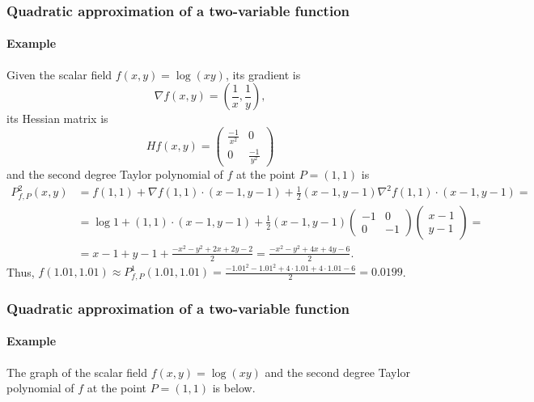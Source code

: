 \begin{frame}
\frametitle{Quadratic approximation of a two-variable function}
\framesubtitle{Example}
Given the scalar field $f(x,y)=\log(xy)$, its gradient is
\[
\nabla f(x,y) = \left(\frac{1}{x},\frac{1}{y}\right),
\]
its Hessian matrix is
\[
Hf(x,y) = \left(
\begin{array}{cc}
\frac{-1}{x^2} & 0\\
0 & \frac{-1}{y^2}
\end{array}
\right)
\]
and the second degree Taylor polynomial of $f$ at the point $P=(1,1)$ is 
\begin{align*}
P^2_{f,P}(x,y) &= f(1,1) +\nabla f(1,1)\cdot (x-1,y-1) + \frac{1}{2}(x-1,y-1)\nabla^2f(1,1)\cdot(x-1,y-1)=\\
&= \log 1+(1,1)\cdot(x-1,y-1) + \frac{1}{2}(x-1,y-1)
\left(
\begin{array}{cc}
-1 & 0\\
0 & -1
\end{array}
\right)
\left(
\begin{array}{c}
x-1\\
y-1
\end{array}
\right)
= \\
&= x-1+y-1+\frac{-x^2-y^2+2x+2y-2}{2} = \frac{-x^2-y^2+4x+4y-6}{2}.
\end{align*}
Thus, $\displaystyle f(1.01,1.01) \approx P^1_{f,P}(1.01,1.01) = \frac{-1.01^2-1.01^2+4\cdot 1.01+4\cdot 1.01-6}{2} = 0.0199$.
\end{frame}


\begin{frame}
\frametitle{Quadratic approximation of a two-variable function}
\framesubtitle{Example}
The graph of the scalar field $f(x,y)=\log(xy)$ and the second degree Taylor polynomial of $f$ at the point $P=(1,1)$ is below. 
\begin{center}

\end{center}
\end{frame}



